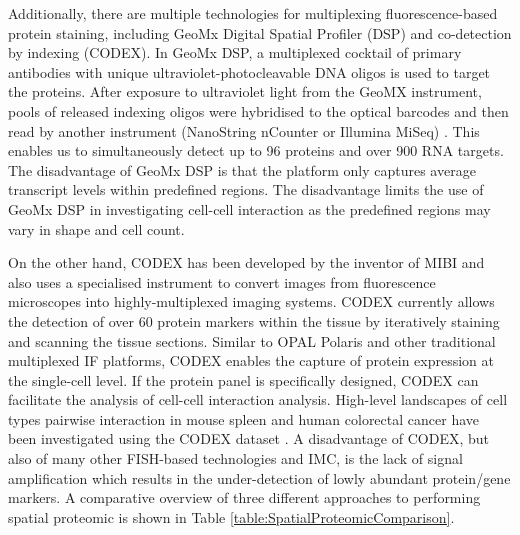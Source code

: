 Additionally, there are multiple technologies for multiplexing fluorescence-based protein staining, including GeoMx Digital Spatial Profiler (DSP) and co-detection by indexing (CODEX). In GeoMx DSP, a multiplexed cocktail of primary antibodies with unique ultraviolet-photocleavable DNA oligos is used to target the proteins. After exposure to ultraviolet light from the GeoMX instrument, pools of released indexing oligos were hybridised to the optical barcodes and then read by another instrument (\ie NanoString nCounter or Illumina MiSeq) \cite{de2020unraveling, helmink2020b}. This enables us to simultaneously detect up to 96 proteins and over 900 RNA targets. The disadvantage of GeoMx DSP is that the platform only captures average transcript levels within predefined regions. The disadvantage limits the use of GeoMx DSP in investigating cell-cell interaction as the predefined regions may vary in shape and cell count. 

On the other hand, CODEX has been developed by the inventor of MIBI and also uses a specialised instrument to convert images from fluorescence microscopes into highly-multiplexed imaging systems. CODEX currently allows the detection of over 60 protein markers within the tissue by iteratively staining and scanning the tissue sections\cite{goltsev2018deep}. Similar to OPAL Polaris and other traditional multiplexed IF platforms, CODEX enables the capture of protein expression at the single-cell level. If the protein panel is specifically designed, CODEX can facilitate the analysis of cell-cell interaction analysis. High-level landscapes of cell types pairwise interaction in mouse spleen and human colorectal cancer have been investigated using the CODEX dataset \cite{schurch2020coordinated, goltsev2018CODEX}. A disadvantage of CODEX, but also of many other FISH-based technologies and IMC, is the lack of signal amplification which results in the under-detection of lowly abundant protein/gene markers. A comparative overview of three different approaches to performing spatial proteomic is shown in Table \ref{table:SpatialProteomicComparison}. 

